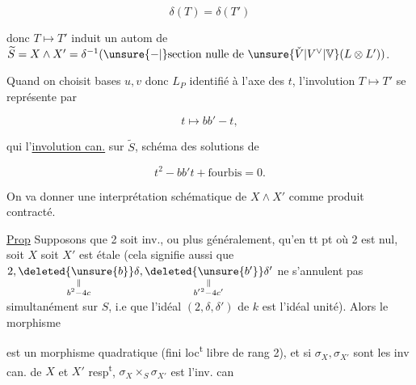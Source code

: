 
\[
\delta(T)=\delta(T')
\]

donc $T\mapsto T'$ induit un  autom
de $\widetilde S=X\wedge X'=\delta^{-1}(\unsure{-|{}}\text{section nulle de }\unsure{\check V|V^\vee|\mathbb V}(L\otimes L'))$.

Quand on choisit bases $u,v$ donc
$L_P$ identifié à l'axe des $t$, l'involution
$T\mapsto T'$  se représente par

\[
t\longmapsto bb'-t,
\]

qui   l'\uline{involution can.} sur $\widetilde S$, schéma
des solutions de

\[
t^2-bb't+\text{fourbis}=0.
\]

 On va donner une interprétation
schématique de $X\wedge X'$ comme produit
contracté.

\uline{Prop} Supposons que 2 soit inv., ou
plus généralement, qu'en tt pt où 2 est nul,
soit $X$ soit $X'$ est étale (cela signifie
aussi que $2,\underset{\substack{\parallel\\ b^2-4c}}{\deleted{\unsure{b}}\delta},\underset{\substack{\parallel\\ b'{}^2-4c'}}{\deleted{\unsure{b'}}\delta'}$ ne s'annulent pas
simultanément sur $S$, i.e que
l'idéal $(2,\delta,\delta')$ de $k$ est l'idéal unité).
Alors le  morphisme


est  un morphisme quadratique
(fini loc\textsuperscript{t} libre de rang 2), et si $\sigma_X,\sigma_{X'}$ sont
les inv can. de $X$ et $X'$ resp\textsuperscript{t}, $\sigma_X\times_S\sigma_{X'}$ est l'inv. can

